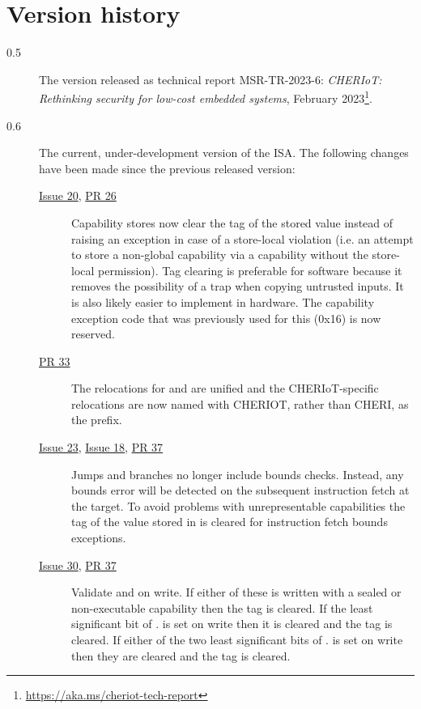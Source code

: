 \newcommand{\ghissue}[1]{\href{https://github.com/microsoft/cheriot-sail/issues/#1}{Issue #1}}
\newcommand{\ghpr}[1]{\href{https://github.com/microsoft/cheriot-sail/pull/#1}{PR #1}}
\chapter{Version history}
\label{chap:changes}

\begin{description}
\item[0.5] The version released as technical report MSR-TR-2023-6: \emph{CHERIoT: Rethinking security for low-cost embedded systems}, February 2023\footnote{\url{https://aka.ms/cheriot-tech-report}}.
\item[0.6] The current, under-development version of the ISA. The following changes have been made since the previous released version:
  \begin{description}
    \item[\ghissue{20}, \ghpr{26}] Capability stores now clear the tag of the stored value instead of raising an exception in case of a store-local violation
    (i.e. an attempt to store a non-global capability via a capability without the store-local permission).
    Tag clearing is preferable for software because it removes the possibility of a trap when copying untrusted inputs.
    It is also likely easier to implement in hardware.
    The capability exception code that was previously used for this (0x16) is now reserved.
    \item[\ghpr{33}] The relocations for  and  are unified and the CHERIoT-specific relocations are now named with CHERIOT, rather than CHERI, as the prefix.
    \item[\ghissue{23}, \ghissue{18}, \ghpr{37}] Jumps and branches no longer include bounds checks.
    Instead, any \PCC{} bounds error will be detected on the subsequent instruction fetch at the target.
    To avoid problems with unrepresentable capabilities the tag of the value stored in \EPCC{} is cleared for instruction fetch bounds exceptions.
    \item[\ghissue{30}, \ghpr{37}] Validate \MEPCC{} and \MTCC{} on write.
    If either of these is written with a sealed or non-executable capability then the tag is cleared.
    If the least significant bit of \MEPCC{}.\caddress{} is set on write then it is cleared and the tag is cleared.
    If either of the two least significant bits of \MTCC{}.\caddress{} is set on write then they are cleared and the tag is cleared.

\end{description}
\end{description}
